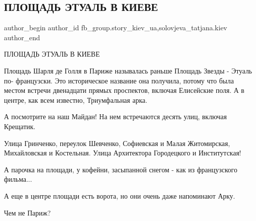  
 
 
 
 
 
\subsection{ПЛОЩАДЬ ЭТУАЛЬ В КИЕВЕ}
\label{sec:30_01_2022.fb.fb_group.story_kiev_ua.2.ploschad_etual_v_kieve}
 
\ifcmt
 author_begin
   author_id fb_group.story_kiev_ua,solovjeva_tatjana.kiev
 author_end
\fi

ПЛОЩАДЬ ЭТУАЛЬ В КИЕВЕ

Площадь Шарля де Голля в Париже называлась раньше Площадь Звезды - Этуаль по-
французски. Это историческое название она получила, потому что была местом
встречи двенадцати прямых проспектов, включая Елисейские поля. А в центре, как
всем известно, Триумфальная арка.


А посмотрите на наш Майдан! На нем встречаются десять улиц, включая Крещатик.


Улица Гринченко, переулок Шевченко, Софиевская и Малая Житомирская,
Михайловская и Костельная. Улица Архитектора Городецкого и Институтская!

А парочка на площади, у кофейни, засыпанной снегом - как из французского
фильма...

А еще в центре площади есть ворота, но они очень даже напоминают Арку.

Чем не Париж?
